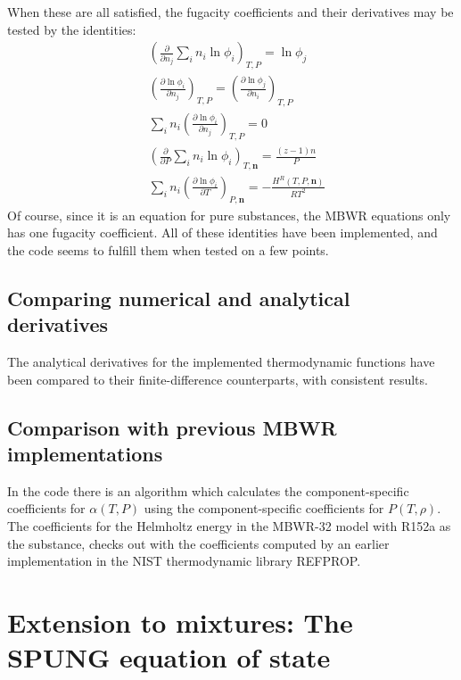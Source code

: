 \documentclass[english]{../thermomemo/thermomemo}
\newcommand*{\pder}[2]{\left(\frac{\partial #1}{\partial #2}\right)}
\numberwithin{equation}{section}
\begin{document}
When these are all satisfied, the fugacity coefficients and their
derivatives may be tested by the identities:
\begin{align}
  \label{test:4}
  & \left( \frac{\partial}{\partial n_j} \sum_i n_i \ln \phi_i \right)_{T,P} = \ln \phi_j \\
  \label{test:5}
  & \pder{\ln \phi_i}{n_j}_{T,P} = \pder{\ln \phi_j}{n_i}_{T,P} \\
  \label{test:6}
  & \sum_i n_i \pder{\ln \phi_i}{n_j}_{T,P} = 0 \\
  \label{test:7}
  & \left( \frac{\partial}{\partial P} \sum_i n_i \ln \phi_i \right)_{T,\textbf{n}} = \frac{(z-1) n}{P} \\
  \label{test:8}
  & \sum_i n_i \pder{ \ln \phi_i}{T}_{P,\textbf{n}} =
  -\frac{H^R(T,P,\textbf{n})}{RT^2}
\end{align}
Of course, since it is an equation for pure substances, the MBWR
equations only has one fugacity
coefficient. All of these identities have been implemented, and the
code seems to fulfill them when tested on a few points.

\subsection{Comparing numerical and analytical derivatives}
The analytical derivatives for the implemented thermodynamic functions
have been compared to their finite-difference counterparts, with
consistent results.

\subsection{Comparison with previous MBWR implementations}
In the code there is an algorithm which calculates the component-specific coefficients for $\alpha(T,P)$ using the component-specific coefficients for $P(T,\rho)$. The coefficients for the Helmholtz energy in the MBWR-32 model with R152a as the substance, checks out with the coefficients computed by an earlier implementation in the NIST thermodynamic library REFPROP.

\section{Extension to mixtures: The SPUNG equation of state}
\end{document}
